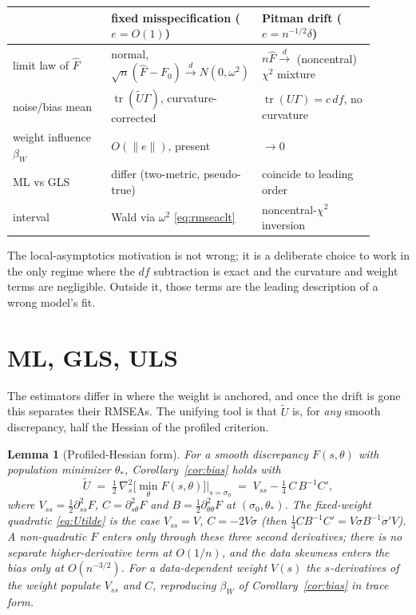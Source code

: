 \documentclass[11pt]{article}
\newcommand{\tr}{\operatorname{tr}}
\newcommand{\dto}{\xrightarrow{d}}
\theoremstyle{plain}
\newtheorem{lemma}{Lemma}
\theoremstyle{remark}
\begin{document}
\begin{center}
\begin{tabular}{p{0.27\linewidth}p{0.32\linewidth}p{0.31\linewidth}}
 & fixed misspecification ($e=O(1)$) & Pitman drift ($e=n^{-1/2}\delta$)\\
\hline
limit law of $\hat F$ & normal, $\sqrt n(\hat F-F_0)\dto N(0,\omega^2)$ &
$n\hat F\dto$ (noncentral) $\chi^2$ mixture\\
noise/bias mean & $\tr(\tilde U\Gamma)$, curvature-corrected &
$\tr(U\Gamma)=c\,df$, no curvature\\
weight influence $\beta_W$ & $O(\|e\|)$, present & $\to0$\\
ML vs GLS & differ (two-metric, pseudo-true) & coincide to leading order\\
interval & Wald via $\omega^2$ \eqref{eq:rmseaclt} & noncentral-$\chi^2$ inversion\\
\end{tabular}
\end{center}

The local-asymptotics motivation is not wrong; it is a deliberate choice to work
in the only regime where the $df$ subtraction is exact and the curvature and
weight terms are negligible. Outside it, those terms are the leading description
of a wrong model's fit.

\section{ML, GLS, ULS}\label{sec:estimators}

The estimators differ in where the weight is anchored, and once the drift is gone
this separates their RMSEAs. The unifying tool is that $\tilde U$ is, for
\emph{any} smooth discrepancy, half the Hessian of the profiled criterion.

\begin{lemma}[Profiled-Hessian form]\label{lem:profhess}
For a smooth discrepancy $F(s,\theta)$ with population minimizer $\theta_\ast$,
Corollary~\ref{cor:bias} holds with
\begin{equation}\label{eq:profhess}
  \tilde U \;=\; \tfrac12\,\nabla_s^2\Big[\min_\theta F(s,\theta)\Big]\Big|_{s=\sigma_0}
  \;=\; V_{ss}-\tfrac14\,C\,B^{-1}C',
\end{equation}
where $V_{ss}=\tfrac12\partial^2_{ss}F$, $C=\partial^2_{s\theta}F$ and
$B=\tfrac12\partial^2_{\theta\theta}F$ at $(\sigma_0,\theta_\ast)$. The
fixed-weight quadratic \eqref{eq:Utilde} is the case $V_{ss}=V$,
$C=-2V\dot\sigma$ (then $\tfrac14 CB^{-1}C'=V\dot\sigma B^{-1}\dot\sigma'V$). A
non-quadratic $F$ enters only through these three second derivatives; there is no
separate higher-derivative term at $O(1/n)$, and the data skewness enters the
bias only at $O(n^{-3/2})$. For a data-dependent weight $V(s)$ the $s$-derivatives
of the weight populate $V_{ss}$ and $C$, reproducing $\beta_W$ of
Corollary~\ref{cor:bias} in trace form.
\end{lemma}
\end{document}
